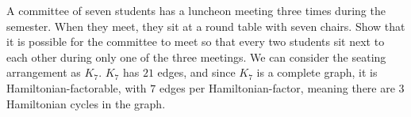 \documentclass[8pt]{extarticle}
\begin{document}
  \begin{problem}{16}
    A committee of seven students has a luncheon meeting three times during the semester. When they meet, they sit at a round table with seven chairs. Show that it is possible for the committee to meet so that every two students sit next to each other during only one of the three meetings.
    \tcblower
    We can consider the seating arrangement as $K_7$. $K_7$ has $21$ edges, and since $K_7$ is a complete graph, it is Hamiltonian-factorable, with $7$ edges per Hamiltonian-factor, meaning there are $3$ Hamiltonian cycles in the graph.
  \end{problem}
\end{document}
